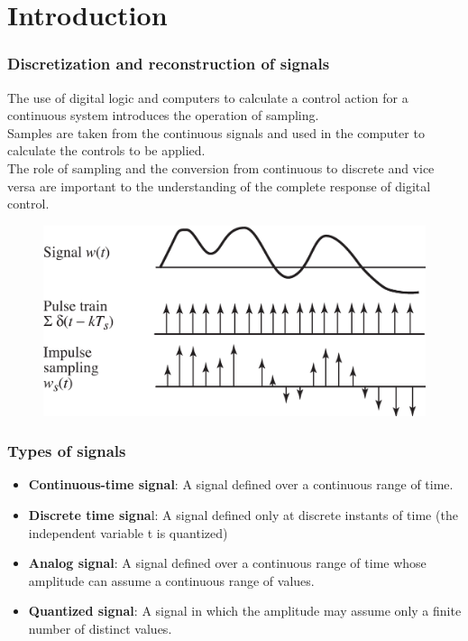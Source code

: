 \section{Introduction}

\begin{frame}
	\frametitle{Discretization and reconstruction of signals}
	The use of digital logic and computers to calculate a control action for a continuous system introduces the operation of sampling.\\
	\medskip
	Samples are taken from the continuous signals and used in the computer to calculate the controls to be applied.\\
	\medskip
	The role of sampling and the conversion from continuous to discrete and vice versa are important to the understanding of the complete response of digital control.
	\begin{figure}
		\includegraphics[width=.55\linewidth]{discretization}
	\end{figure}
\end{frame}

\begin{frame}
	\frametitle{Types of signals}
	\begin{itemize}
		\item \textbf{Continuous-time signal}: A signal defined over a continuous range of time.
		\item \textbf{Discrete time signa}l: A signal defined only at discrete instants of time (the independent variable t is quantized)
		\item \textbf{Analog signal}: A signal defined over a continuous range of time whose amplitude can assume a continuous range of values.
		\item \textbf{Quantized signal}: A signal in which the amplitude may assume only a finite number of distinct values.
	\end{itemize}
\end{frame}

